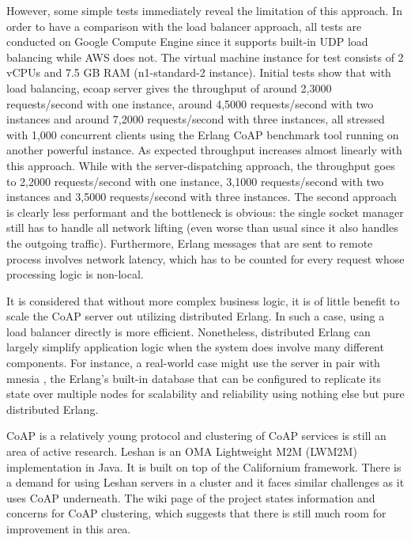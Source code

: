 However, some simple tests immediately reveal the limitation of this approach. In order to have a comparison with the load balancer approach, all tests are conducted on Google Compute Engine \autocite{google_compute_engine} since it supports built-in UDP load balancing while AWS does not. The virtual machine instance for test consists of 2 vCPUs and 7.5 GB RAM (n1-standard-2 instance). Initial tests show that with load balancing, ecoap server gives the throughput of around 2,3000 requests/second with one instance, around 4,5000 requests/second with two instances and around 7,2000 requests/second with three instances, all stressed with 1,000 concurrent clients using the Erlang CoAP benchmark tool running on another powerful instance. As expected throughput increases almost linearly with this approach. While with the server-dispatching approach, the throughput goes to 2,2000 requests/second with one instance, 3,1000 requests/second with two instances and 3,5000 requests/second with three instances. The second approach is clearly less performant and the bottleneck is obvious: the single socket manager still has to handle all network lifting (even worse than usual since it also handles the outgoing traffic). Furthermore, Erlang messages that are sent to remote process involves network latency, which has to be counted for every request whose processing logic is non-local.

It is considered that without more complex business logic, it is of little benefit to scale the CoAP server out utilizing distributed Erlang. In such a case, using a load balancer directly is more efficient. Nonetheless, distributed Erlang can largely simplify application logic when the system does involve many different components. For instance, a real-world case might use the server in pair with mnesia \autocite{mnesia}, the Erlang's built-in database that can be configured to replicate its state over multiple nodes for scalability and reliability using nothing else but pure distributed Erlang. 

CoAP is a relatively young protocol and clustering of CoAP services is still an area of active research. Leshan \autocite{leshan} is an OMA Lightweight M2M (LWM2M) implementation in Java. It is built on top of the Californium framework. There is a demand for using Leshan servers in a cluster and it faces similar challenges as it uses CoAP underneath. The wiki page of the project \autocite{leshan_cluster} states information and concerns for CoAP clustering, which suggests that there is still much room for improvement in this area.

